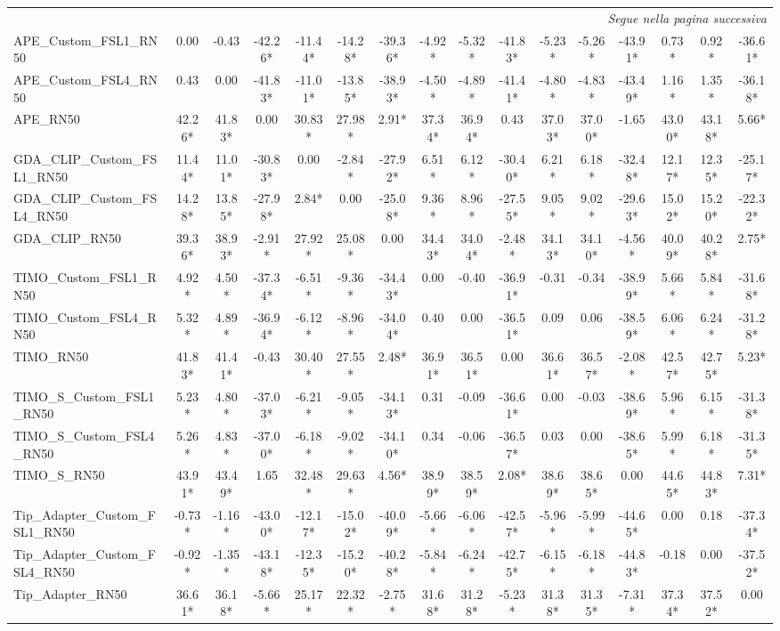 \begin{scriptsize}
\begin{longtable}{l|ccccccccccccccc}
\midrule
\endhead
\midrule
\multicolumn{16}{r}{\textit{Segue nella pagina successiva}} \\
\endfoot
\bottomrule
\endlastfoot
APE\_Custom\_FSL1\_RN50 & 0.00 & -0.43 & -42.26* & -11.44* & -14.28* & -39.36* & -4.92* & -5.32* & -41.83* & -5.23* & -5.26* & -43.91* & 0.73* & 0.92* & -36.61* \\
APE\_Custom\_FSL4\_RN50 & 0.43 & 0.00 & -41.83* & -11.01* & -13.85* & -38.93* & -4.50* & -4.89* & -41.41* & -4.80* & -4.83* & -43.49* & 1.16* & 1.35* & -36.18* \\
APE\_RN50 & 42.26* & 41.83* & 0.00 & 30.83* & 27.98* & 2.91* & 37.34* & 36.94* & 0.43 & 37.03* & 37.00* & -1.65 & 43.00* & 43.18* & 5.66* \\
GDA\_CLIP\_Custom\_FSL1\_RN50 & 11.44* & 11.01* & -30.83* & 0.00 & -2.84* & -27.92* & 6.51* & 6.12* & -30.40* & 6.21* & 6.18* & -32.48* & 12.17* & 12.35* & -25.17* \\
GDA\_CLIP\_Custom\_FSL4\_RN50 & 14.28* & 13.85* & -27.98* & 2.84* & 0.00 & -25.08* & 9.36* & 8.96* & -27.55* & 9.05* & 9.02* & -29.63* & 15.02* & 15.20* & -22.32* \\
GDA\_CLIP\_RN50 & 39.36* & 38.93* & -2.91* & 27.92* & 25.08* & 0.00 & 34.43* & 34.04* & -2.48* & 34.13* & 34.10* & -4.56* & 40.09* & 40.28* & 2.75* \\
TIMO\_Custom\_FSL1\_RN50 & 4.92* & 4.50* & -37.34* & -6.51* & -9.36* & -34.43* & 0.00 & -0.40 & -36.91* & -0.31 & -0.34 & -38.99* & 5.66* & 5.84* & -31.68* \\
TIMO\_Custom\_FSL4\_RN50 & 5.32* & 4.89* & -36.94* & -6.12* & -8.96* & -34.04* & 0.40 & 0.00 & -36.51* & 0.09 & 0.06 & -38.59* & 6.06* & 6.24* & -31.28* \\
TIMO\_RN50 & 41.83* & 41.41* & -0.43 & 30.40* & 27.55* & 2.48* & 36.91* & 36.51* & 0.00 & 36.61* & 36.57* & -2.08* & 42.57* & 42.75* & 5.23* \\
TIMO\_S\_Custom\_FSL1\_RN50 & 5.23* & 4.80* & -37.03* & -6.21* & -9.05* & -34.13* & 0.31 & -0.09 & -36.61* & 0.00 & -0.03 & -38.69* & 5.96* & 6.15* & -31.38* \\
TIMO\_S\_Custom\_FSL4\_RN50 & 5.26* & 4.83* & -37.00* & -6.18* & -9.02* & -34.10* & 0.34 & -0.06 & -36.57* & 0.03 & 0.00 & -38.65* & 5.99* & 6.18* & -31.35* \\
TIMO\_S\_RN50 & 43.91* & 43.49* & 1.65 & 32.48* & 29.63* & 4.56* & 38.99* & 38.59* & 2.08* & 38.69* & 38.65* & 0.00 & 44.65* & 44.83* & 7.31* \\
Tip\_Adapter\_Custom\_FSL1\_RN50 & -0.73* & -1.16* & -43.00* & -12.17* & -15.02* & -40.09* & -5.66* & -6.06* & -42.57* & -5.96* & -5.99* & -44.65* & 0.00 & 0.18 & -37.34* \\
Tip\_Adapter\_Custom\_FSL4\_RN50 & -0.92* & -1.35* & -43.18* & -12.35* & -15.20* & -40.28* & -5.84* & -6.24* & -42.75* & -6.15* & -6.18* & -44.83* & -0.18 & 0.00 & -37.52* \\
Tip\_Adapter\_RN50 & 36.61* & 36.18* & -5.66* & 25.17* & 22.32* & -2.75* & 31.68* & 31.28* & -5.23* & 31.38* & 31.35* & -7.31* & 37.34* & 37.52* & 0.00 \\
\end{longtable}
\end{scriptsize}